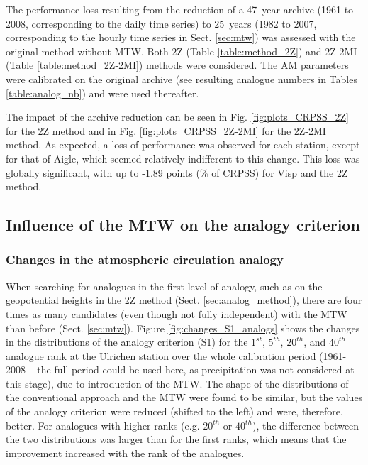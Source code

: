 \documentclass[hess, manuscript]{copernicus}
\begin{document}
	The performance loss resulting from the reduction of a 47~year archive (1961 to 2008, corresponding to the daily time series) to 25~years (1982 to 2007, corresponding to the hourly time series in Sect. \ref{sec:mtw}) was assessed with the original method without MTW. Both 2Z (Table \ref{table:method_2Z}) and 2Z-2MI (Table \ref{table:method_2Z-2MI}) methods were considered. The AM parameters were calibrated on the original archive (see resulting analogue numbers in Tables \ref{table:analog_nb}) and were used thereafter.
	
	The impact of the archive reduction can be seen in Fig. \ref{fig:plots_CRPSS_2Z} for the 2Z method and in Fig. \ref{fig:plots_CRPSS_2Z-2MI} for the 2Z-2MI method. As expected, a loss of performance was observed for each station, except for that of Aigle, which seemed relatively indifferent to this change. This loss was globally significant, with up to -1.89 points (\% of CRPSS) for Visp and the 2Z method. 
	
	
	\subsection{Influence of the MTW on the analogy criterion}
	\label{sec:influence_criteria}
	
	\subsubsection{Changes in the atmospheric circulation analogy}
	\label{sec:perf_2Z}
	
	When searching for analogues in the first level of analogy, such as on the geopotential heights in the 2Z method (Sect. \ref{sec:analog_method}), there are four times as many candidates (even though not fully independent) with the MTW than before (Sect. \ref{sec:mtw}). Figure \ref{fig:changes_S1_analogs} shows the changes in the distributions of the analogy criterion (S1) for the $1^{st}$, $5^{th}$, $20^{th}$, and $40^{th}$ analogue rank at the Ulrichen station over the whole calibration period (1961-2008 -- the full period could be used here, as precipitation was not considered at this stage), due to introduction of the MTW. The shape of the distributions of the conventional approach and the MTW were found to be similar, but the values of the analogy criterion were reduced (shifted to the left) and were, therefore, better. For analogues with higher ranks (e.g. $20^{th}$ or $40^{th}$), the difference between the two distributions was larger than for the first ranks, which means that the improvement increased with the rank of the analogues. 
	
\end{document}

